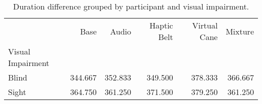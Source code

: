 
\begin{table}[!htb]
\centering
\caption{Duration difference grouped by participant and visual impairment.}
\label{tab:duracao_average_group}
\begin{tabular}{lrrrrr}
\toprule
{} &    Base &   Audio &  Haptic Belt &  Virtual Cane &  Mixture \\
Visual Impairment &         &         &              &               &          \\
\midrule
Blind             & 344.667 & 352.833 &      349.500 &       378.333 &  366.667 \\
Sight             & 364.750 & 361.250 &      371.500 &       379.250 &  361.250 \\
\bottomrule
\end{tabular}
\end{table}

